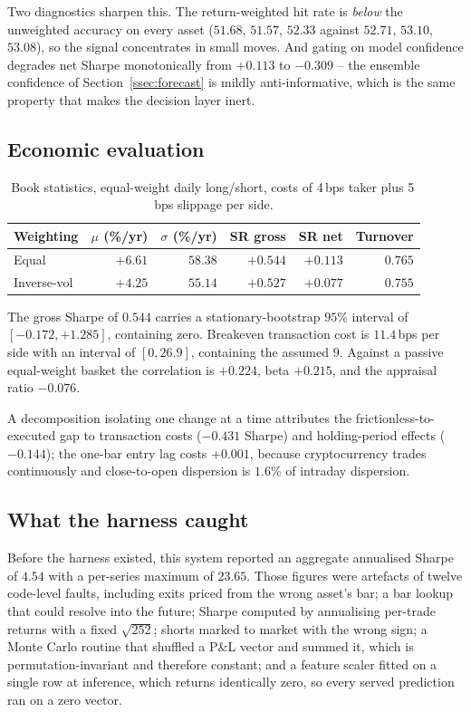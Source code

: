 \documentclass[preprint,12pt,authoryear]{elsarticle}
\begin{document}
Two diagnostics sharpen this. The return-weighted hit rate is \emph{below} the
unweighted accuracy on every asset ($51.68$, $51.57$, $52.33$ against $52.71$,
$53.10$, $53.08$), so the signal concentrates in small moves. And gating on model
confidence degrades net Sharpe monotonically from $+0.113$ to $-0.309$ -- the
ensemble confidence of Section~\ref{ssec:forecast} is mildly anti-informative,
which is the same property that makes the decision layer inert.

\subsection{Economic evaluation}

\begin{table}[t]\centering\small
\caption{Book statistics, equal-weight daily long/short, costs of 4\,bps taker
plus 5\,bps slippage per side.}
\label{tab:book}
\begin{tabular}{@{}lrrrrr@{}}
\toprule
Weighting & $\mu$ (\%/yr) & $\sigma$ (\%/yr) & SR gross & SR net & Turnover \\
\midrule
Equal        & $+6.61$ & $58.38$ & $+0.544$ & $+0.113$ & $0.765$ \\
Inverse-vol  & $+4.25$ & $55.14$ & $+0.527$ & $+0.077$ & $0.755$ \\
\bottomrule
\end{tabular}
\end{table}

The gross Sharpe of $0.544$ carries a stationary-bootstrap
\citep{politis1994stationary} $95\%$ interval of $[-0.172, +1.285]$, containing
zero. Breakeven transaction cost is $11.4$\,bps per side with an interval of
$[0, 26.9]$, containing the assumed $9$. Against a passive equal-weight basket
the correlation is $+0.224$, beta $+0.215$, and the appraisal ratio $-0.076$.

A decomposition isolating one change at a time attributes the frictionless-to-executed
gap to transaction costs ($-0.431$ Sharpe) and holding-period effects
($-0.144$); the one-bar entry lag costs $+0.001$, because cryptocurrency trades
continuously and close-to-open dispersion is $1.6\%$ of intraday dispersion.

\subsection{What the harness caught}
\label{ssec:caught}

Before the harness existed, this system reported an aggregate annualised Sharpe
of $4.54$ with a per-series maximum of $23.65$. Those figures were artefacts of
twelve code-level faults, including exits priced from the wrong asset's bar; a
bar lookup that could resolve into the future; Sharpe computed by annualising
per-trade returns with a fixed $\sqrt{252}$; shorts marked to market with the
wrong sign; a Monte Carlo routine that shuffled a P\&L vector and summed it,
which is permutation-invariant and therefore constant; and a feature scaler
fitted on a single row at inference, which returns identically zero, so every
served prediction ran on a zero vector.
\end{document}
